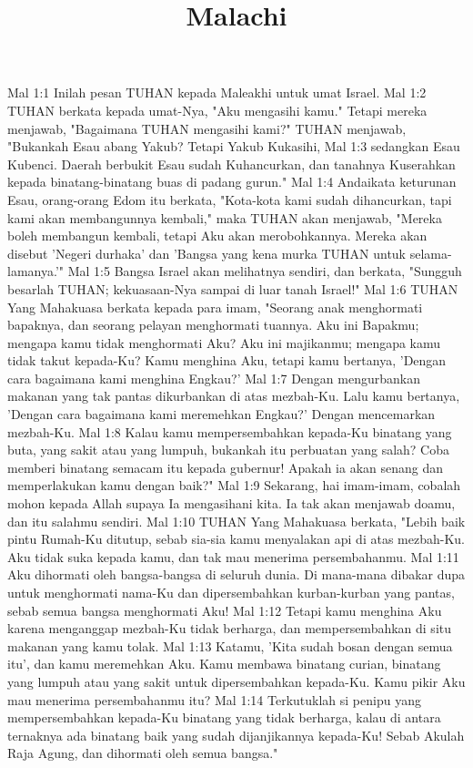 

\title{Malachi}

Mal 1:1  Inilah pesan TUHAN kepada Maleakhi untuk umat Israel.
Mal 1:2  TUHAN berkata kepada umat-Nya, "Aku mengasihi kamu." Tetapi mereka menjawab, "Bagaimana TUHAN mengasihi kami?" TUHAN menjawab, "Bukankah Esau abang Yakub? Tetapi Yakub Kukasihi,
Mal 1:3  sedangkan Esau Kubenci. Daerah berbukit Esau sudah Kuhancurkan, dan tanahnya Kuserahkan kepada binatang-binatang buas di padang gurun."
Mal 1:4  Andaikata keturunan Esau, orang-orang Edom itu berkata, "Kota-kota kami sudah dihancurkan, tapi kami akan membangunnya kembali," maka TUHAN akan menjawab, "Mereka boleh membangun kembali, tetapi Aku akan merobohkannya. Mereka akan disebut 'Negeri durhaka' dan 'Bangsa yang kena murka TUHAN untuk selama-lamanya.'"
Mal 1:5  Bangsa Israel akan melihatnya sendiri, dan berkata, "Sungguh besarlah TUHAN; kekuasaan-Nya sampai di luar tanah Israel!"
Mal 1:6  TUHAN Yang Mahakuasa berkata kepada para imam, "Seorang anak menghormati bapaknya, dan seorang pelayan menghormati tuannya. Aku ini Bapakmu; mengapa kamu tidak menghormati Aku? Aku ini majikanmu; mengapa kamu tidak takut kepada-Ku? Kamu menghina Aku, tetapi kamu bertanya, 'Dengan cara bagaimana kami menghina Engkau?'
Mal 1:7  Dengan mengurbankan makanan yang tak pantas dikurbankan di atas mezbah-Ku. Lalu kamu bertanya, 'Dengan cara bagaimana kami meremehkan Engkau?' Dengan mencemarkan mezbah-Ku.
Mal 1:8  Kalau kamu mempersembahkan kepada-Ku binatang yang buta, yang sakit atau yang lumpuh, bukankah itu perbuatan yang salah? Coba memberi binatang semacam itu kepada gubernur! Apakah ia akan senang dan memperlakukan kamu dengan baik?"
Mal 1:9  Sekarang, hai imam-imam, cobalah mohon kepada Allah supaya Ia mengasihani kita. Ia tak akan menjawab doamu, dan itu salahmu sendiri.
Mal 1:10  TUHAN Yang Mahakuasa berkata, "Lebih baik pintu Rumah-Ku ditutup, sebab sia-sia kamu menyalakan api di atas mezbah-Ku. Aku tidak suka kepada kamu, dan tak mau menerima persembahanmu.
Mal 1:11  Aku dihormati oleh bangsa-bangsa di seluruh dunia. Di mana-mana dibakar dupa untuk menghormati nama-Ku dan dipersembahkan kurban-kurban yang pantas, sebab semua bangsa menghormati Aku!
Mal 1:12  Tetapi kamu menghina Aku karena menganggap mezbah-Ku tidak berharga, dan mempersembahkan di situ makanan yang kamu tolak.
Mal 1:13  Katamu, 'Kita sudah bosan dengan semua itu', dan kamu meremehkan Aku. Kamu membawa binatang curian, binatang yang lumpuh atau yang sakit untuk dipersembahkan kepada-Ku. Kamu pikir Aku mau menerima persembahanmu itu?
Mal 1:14  Terkutuklah si penipu yang mempersembahkan kepada-Ku binatang yang tidak berharga, kalau di antara ternaknya ada binatang baik yang sudah dijanjikannya kepada-Ku! Sebab Akulah Raja Agung, dan dihormati oleh semua bangsa."
